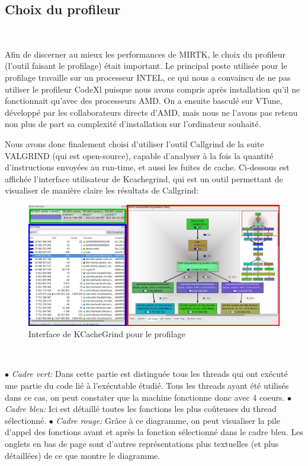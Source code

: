 \documentclass[10pt]{report}
\begin{document}
		\subsection{Choix du profileur}~\par
		Afin de discerner au mieux les performances de MIRTK, le choix du profileur (l'outil faisant le profilage) était important. Le principal poste utilisée pour le profilage travaille sur un processeur INTEL, ce qui nous a convaincu de ne pas utiliser le profileur CodeXl puisque nous avons compris après installation qu'il ne fonctionnait qu'avec des processeurs AMD. On a ensuite basculé sur VTune, développé par les collaborateurs directs d'AMD, mais nous ne l'avons pas retenu non plus de part sa complexité d'installation sur l'ordinateur souhaité.
		
		Nous avons donc finalement choisi d'utiliser l'outil Callgrind de la suite VALGRIND (qui est open-source), capable d'analyser à la fois la quantité d'instructions envoyées au run-time, et aussi les fuites de cache.
		Ci-dessous est affichée l'interface utilisateur de Kcachegrind, qui est un outil permettant de visualiser de manière claire les résultats de Callgrind:
		\begin{figure}[h!]
			\begin{center}
				\includegraphics[width=13cm]{Reports/figures/UIkcachegrind.png}
			\end{center}	
			\caption{Interface de KCacheGrind pour le profilage}
			\label{Interface de KCacheGrind pour le profilage}
		\end{figure}~\par
		{$\bullet$} \textit{Cadre vert: } Dans cette partie est distinguée tous les threads qui ont exécuté une partie du code lié à l'exécutable étudié. Tous les threads ayant été utilisés dans ce cas, on peut constater que la machine fonctionne donc avec 4 coeurs. \newline
		{$\bullet$} \textit{Cadre bleu: } Ici est détaillé toutes les fonctions les plus coûteuses du thread sélectionné. \newline
		{$\bullet$} \textit{Cadre rouge: } Grâce à ce diagramme, on peut visualiser la pile d'appel des fonctions avant et après la fonction sélectionné dans le cadre bleu. Les onglets en bas de page sont d'autres représentations plus textuelles (et plus détaillées) de ce que montre le diagramme. \newline
		
\end{document}
